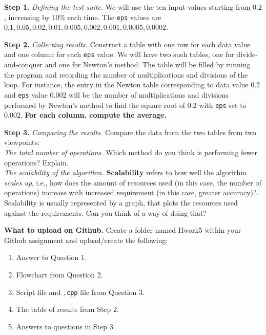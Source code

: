 \documentclass[11pt, psfig]{article}
\begin{document}
{\bf Step 1.}
 {\em Defining the test suite.} We will use the ten
input values starting from $0.2$, increasing by $10\%$ each time.
 The {\tt eps} values are 
$0.1,0.05, 0.02, 0.01, 0.005, 0.002, 0.001, 0.0005, 0.0002$.

{\bf Step 2.} {\em Collecting results.} Construct a table with one row for each data value 
and one column for each {\tt eps} value. We will have two such tables, 
one for divide-and-conquer and one for Newton's method. The table will 
be filled by running the program and recording the number of multiplications and divisions
of the loop. For instance, the  entry in the Newton 
table corresponding to data value $0.2$ and {\tt eps} value $0.002$ will 
be the number of  multiplications and divisions performed by Newton's method to find the 
square root of $0.2$ with {\tt eps} set to $0.002$. {\bf For each column, 
compute the average.}

{\bf Step 3.} {\em Comparing the results.}  Compare the data from the two tables from two 
viewpoints:\\
{\em The total number of operations.} Which method do you think is performing fewer operations? Explain.\\
{\em The scalability of the algorithm.} {\bf Scalability } refers to how well the algorithm {\em scales up}, i.e.,
how does the amount of resources used (in this case, the number of operations) increase with 
increased requirement (in this case, greater accuracy)?.  Scalability is usually represented by a graph, that plots the resources used against the requirements. Can you think of a way of doing that?


 
 

 
{\bf What to upload on Github.} Create a folder named Hwork5 within your Github assignment and upload/create the following: \\
\begin{enumerate}

\item Answer to Question 1.

\item Flowchart from Question 2.

\item Script file and {\tt .cpp} file from Question 3.

\item The table of results from Step 2.


\item Answers to questions in Step 3.

\end{enumerate}
\end{document}
